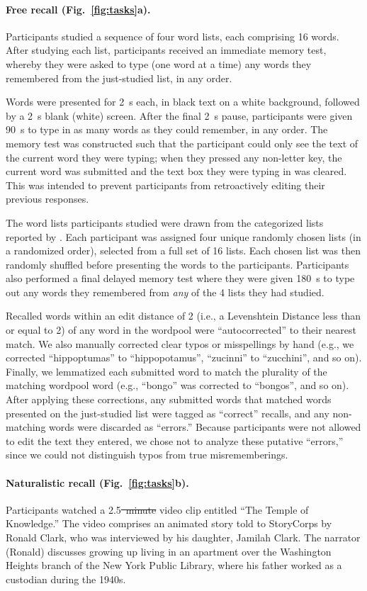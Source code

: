 \documentclass[10pt]{article}
\providecommand{\DIFaddtex}[1]{{\protect\color{blue}\uwave{#1}}} %
\providecommand{\DIFdeltex}[1]{{\protect\color{red}\sout{#1}}}                      %
\providecommand{\DIFaddbegin}{} %
\providecommand{\DIFaddend}{} %
\providecommand{\DIFdelbegin}{} %
\providecommand{\DIFdelend}{} %
\providecommand{\DIFadd}[1]{\texorpdfstring{\DIFaddtex{#1}}{#1}} %
\providecommand{\DIFdel}[1]{\texorpdfstring{\DIFdeltex{#1}}{}} %
\newcommand{\DIFscaledelfig}{0.5}
\newlength{\DIFdelgraphicswidth} %
\newlength{\DIFdelgraphicsheight} %
\newcommand{\DIFaddincludegraphics}[2][]{{\color{blue}\fbox{\DIFOincludegraphics[#1]{#2}}}} %
\newcommand{\DIFdelincludegraphics}[2][]{%
\sbox{\DIFdelgraphicsbox}{\DIFOincludegraphics[#1]{#2}}%
\settoboxwidth{\DIFdelgraphicswidth}{\DIFdelgraphicsbox} %
\settoboxtotalheight{\DIFdelgraphicsheight}{\DIFdelgraphicsbox} %
\scalebox{\DIFscaledelfig}{%
\parbox[b]{\DIFdelgraphicswidth}{\usebox{\DIFdelgraphicsbox}\\[-\baselineskip] \rule{\DIFdelgraphicswidth}{0em}}\llap{\resizebox{\DIFdelgraphicswidth}{\DIFdelgraphicsheight}{%
\setlength{\unitlength}{\DIFdelgraphicswidth}%
\begin{picture}(1,1)%
\thicklines\linethickness{2pt} %
{\color[rgb]{1,0,0}\put(0,0){\framebox(1,1){}}}%
{\color[rgb]{1,0,0}\put(0,0){\line( 1,1){1}}}%
{\color[rgb]{1,0,0}\put(0,1){\line(1,-1){1}}}%
\end{picture}%
}\hspace*{3pt}}} %
} %
\DeclareRobustCommand{\DIFaddbegin}{\DIFOaddbegin \let\includegraphics\DIFaddincludegraphics} %
\DeclareRobustCommand{\DIFaddend}{\DIFOaddend \let\includegraphics\DIFOincludegraphics} %
\DeclareRobustCommand{\DIFdelbegin}{\DIFOdelbegin \let\includegraphics\DIFdelincludegraphics} %
\DeclareRobustCommand{\DIFdelend}{\DIFOaddend \let\includegraphics\DIFOincludegraphics} %
\begin{document}
\paragraph*{Free recall (Fig.~\ref{fig:tasks}a).} 
Participants studied a sequence of four word lists, each comprising 16
words.  After studying each list, participants received an immediate
memory test, whereby they were asked to type (one word at a time) any
words they remembered from the just-studied list, in any order.

Words were presented for 2~s each, in black text on a white
background, followed by a 2~s blank (white) screen.  After the final
2~s pause, participants were given 90~s to type in as many words as
they could remember, in any order.  The memory test was constructed
such that the participant could only see the text of the current word
they were typing; when they pressed any non-letter key, the current
word was submitted and the text box they were typing in was cleared.
This was intended to prevent participants from retroactively editing
their previous responses.

The word lists participants studied were drawn from the categorized
lists reported by \cite{ZimaEtal18}.  Each participant was assigned
four unique randomly chosen lists (in a randomized order), selected
from a full set of 16 lists.  Each chosen list was then randomly
shuffled before presenting the words to the participants.
Participants also performed a final delayed memory test where they
were given 180~s to type out any words they remembered from
\textit{any} of the 4 lists they had studied.

Recalled words within an edit distance of 2 (i.e., a Levenshtein Distance less
than or equal to 2) of any word in the wordpool were ``autocorrected''
to their nearest match.  We also manually corrected clear typos or
misspellings by hand (e.g., we corrected ``hippoptumas'' to
``hippopotamus'', ``zucinni'' to ``zucchini'', and so on).  Finally,
we lemmatized each submitted word to match the plurality of the
matching wordpool word (e.g., ``bongo'' was corrected to ``bongos'',
and so on).  After applying these corrections, any submitted words
that matched words presented on the just-studied list were tagged as
``correct'' recalls, and any non-matching words were discarded as
``errors.''  Because participants were not allowed to edit the text
they entered, we chose not to analyze these putative ``errors,'' since
we could not distinguish typos from true misrememberings.

\paragraph*{Naturalistic recall (Fig.~\ref{fig:tasks}b).}
Participants watched a 2.5\DIFdelbegin \DIFdel{~minute }\DIFdelend \DIFaddbegin \DIFadd{-minute }\DIFaddend video clip entitled ``The Temple of
Knowledge.''  The video comprises an animated story told to StoryCorps
by Ronald Clark, who was interviewed by his daughter, Jamilah Clark.
The narrator (Ronald) discusses growing up living in an apartment over
the Washington Heights branch of the New York Public Library, where his
father worked as a custodian during the 1940s.
\end{document}
